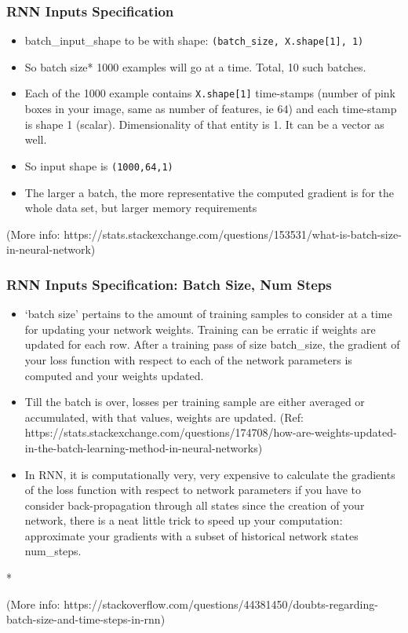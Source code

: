 \begin{frame}[fragile] \frametitle{RNN Inputs Specification}
\begin{itemize}
\item batch\_input\_shape to be with shape: \lstinline|(batch_size, X.shape[1], 1)|
\item So batch size* 1000 examples will go at a time. Total, 10 such batches.
\item Each of the 1000 example contains \lstinline|X.shape[1]| time-stamps (number of pink boxes in your image, same as number of features, ie 64) and each time-stamp is shape 1 (scalar). Dimensionality of that entity is 1. It can be a vector as well.
\item So input shape is \lstinline|(1000,64,1)|
\item The larger a batch, the more representative the computed gradient is for the whole data set, but larger memory requirements
\end{itemize}

{\tiny (More info: https://stats.stackexchange.com/questions/153531/what-is-batch-size-in-neural-network)}

\end{frame}

\begin{frame}[fragile] \frametitle{RNN Inputs Specification: Batch Size, Num Steps}
\begin{itemize}
\item `batch size' pertains to the amount of training samples to consider at a time for updating your network weights. Training can be erratic if weights are updated for each row. After a training pass of size batch\_size, the gradient of your loss function with respect to each of the network parameters is computed and your weights updated.
\item Till the batch is over, losses per training sample are either averaged or accumulated, with that values, weights are updated. {\tiny (Ref: https://stats.stackexchange.com/questions/174708/how-are-weights-updated-in-the-batch-learning-method-in-neural-networks)}

\item In RNN, it is computationally very, very expensive to calculate the gradients of the loss function with respect to network parameters if you have to consider back-propagation through all states since the creation of your network, there is a neat little trick to speed up your computation: approximate your gradients with a subset of historical network states num\_steps.
\end{itemize}

*

{\tiny (More info: https://stackoverflow.com/questions/44381450/doubts-regarding-batch-size-and-time-steps-in-rnn)}

\end{frame}


